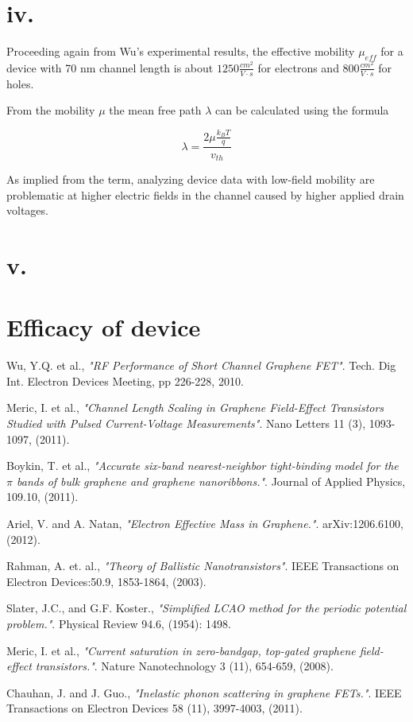 \documentclass[11pt]{article}
\begin{document}
\section*{iv.}
Proceeding again from Wu's experimental results, the effective mobility $\mu_{eff}$ for a device with 70 nm channel length is about $1250 \frac{cm^2}{V\cdot s}$ for electrons and $800 \frac{cm^2}{V\cdot s}$ for holes.

From the mobility $\mu$ the mean free path $\lambda$ can be calculated using the formula

$$\lambda = \frac{2\mu\frac{k_BT}{q}}{v_{th}}$$

As implied from the term, analyzing device data with low-field mobility are problematic at higher electric fields in the channel caused by higher applied drain voltages.

\section*{v.}

\section*{Efficacy of device}

\begin{thebibliography}{9}

  Wu, Y.Q. et al.,
  \textit{"RF Performance of Short Channel Graphene FET"}.
  Tech. Dig Int. Electron Devices Meeting,
  pp 226-228,
  2010.
  
  Meric, I. et al.,
  \textit{"Channel Length Scaling in Graphene Field-Effect Transistors Studied with Pulsed Current-Voltage Measurements"}.
  Nano Letters 11 (3),
  1093-1097,
  (2011).
  
  Boykin, T. et al.,
  \textit{"Accurate six-band nearest-neighbor tight-binding model for the $\pi$ bands of bulk graphene and graphene nanoribbons."}.
  Journal of Applied Physics,
  109.10,
  (2011).
  
  Ariel, V. and A. Natan,
  \textit{"Electron Effective Mass in Graphene."}.
  arXiv:1206.6100,
  (2012).
  
  Rahman, A. et. al.,
  \textit{"Theory of Ballistic Nanotransistors"}.
   IEEE Transactions on Electron Devices:50.9,
   1853-1864,
    (2003).
    
  Slater, J.C., and G.F. Koster.,
  \textit{"Simplified LCAO method for the periodic potential problem."}.
   Physical Review 94.6,
    (1954): 1498.
    
  Meric, I. et al.,
  \textit{"Current saturation in zero-bandgap, top-gated graphene field-effect transistors."}.
   Nature Nanotechnology 3 (11),
  654-659,
  (2008).
  
  Chauhan, J. and J. Guo.,
  \textit{"Inelastic phonon scattering in graphene FETs."}.
   IEEE Transactions on Electron Devices 58 (11),
  3997-4003,
  (2011).
  
\end{thebibliography}
\end{document}
